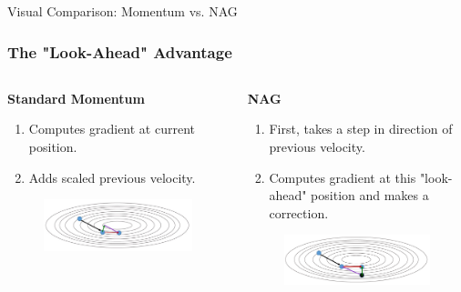 \begin{frame}{Visual Comparison: Momentum vs. NAG}
    \frametitle{The "Look-Ahead" Advantage}
    \begin{columns}[T]
        \begin{column}{0.5\textwidth}
            \textbf{Standard Momentum}
            \footnotesize %
            \begin{enumerate}
                \item Computes gradient at current position.
                \item Adds scaled previous velocity.
            \end{enumerate}
            
            \begin{figure}
                \includegraphics[width=\linewidth]{images/standard_momentum.jpg}
            \end{figure}
        \end{column}
        
        \begin{column}{0.5\textwidth}
            \textbf{NAG}
            \footnotesize %
            \begin{enumerate}
                \item First, takes a step in direction of previous velocity.
                \item Computes gradient at this "look-ahead" position and makes a correction.
            \end{enumerate}
            
            \begin{figure}
                \includegraphics[width=\linewidth]{images/nag.png}
            \end{figure}
        \end{column}
    \end{columns}
    
\end{frame}
